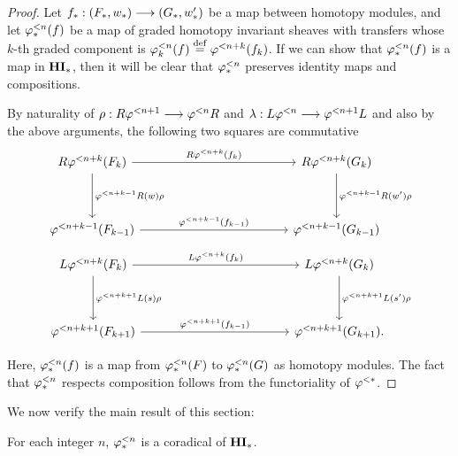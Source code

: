 \begin{proof}
Let $f_*: (F_*,\deloop_*) \to (G_*, \deloop_*')$ be a map between 
homotopy modules, and let $\tlHM{n}(f)$ be a map of graded 
homotopy invariant sheaves with transfers whose
$k$-th graded component is $\tlHM[k]{n}(f) \defeq \tlHI{n + k}(f_k)$. 
If we can show that $\tlHM{n}(f)$ is a map in $\HM$, then it will
be clear that $\tlHM{n}$ preserves identity maps and compositions.

By naturality of $\rho : R\tlHI{n + 1} \to \tlHI{n} R$ and 
$\lambda: L\tlHI{n} \to \tlHI{n + 1}L$ and also by the above 
arguments, the following two squares are commutative
\[
\begin{tikzcd}[column sep=12em, row sep=huge]
R\tlHI{n + k}(F_k) \arrow{r}{R \tlHI{n + k}(f_k)} 
   \arrow{d}{\tlHI{n + k - 1}R(\deloop) \rho} &
R\tlHI{n + k}(G_k) 
   \arrow{d}{\tlHI{n + k - 1}R(\deloop') \rho} \\
\tlHI{n + k - 1}(F_{k - 1}) 
   \arrow{r}{\tlHI{n + k - 1}(f_{k - 1})} &
\tlHI{n + k - 1}(G_{k - 1}) 
\end{tikzcd}
\]
\[
\begin{tikzcd}[column sep=12em, row sep=huge]
L\tlHI{n + k}(F_k) \arrow{r}{L \tlHI{n + k}(f_k)} 
   \arrow{d}{\tlHI{n + k + 1}L(\susp) \rho} &
L\tlHI{n + k}(G_k) 
   \arrow{d}{\tlHI{n + k + 1}L(\susp') \rho} \\
\tlHI{n + k + 1}(F_{k + 1}) 
   \arrow{r}{\tlHI{n + k + 1}(f_{k - 1})} &
\tlHI{n + k + 1}(G_{k + 1}).
\end{tikzcd}
\]

Here, $\tlHM{n}(f)$ is a map from $\tlHM{n}(F)$ to 
$\tlHM{n}(G)$ as homotopy modules. The fact that $\tlHM{n}$ 
respects composition follows from the functoriality of $\tlHI{*}$.
\end{proof}

We now verify the main result of this section:

\begin{thm}\label{thm_tlHM_corad}
For each integer $n$, $\tlHM{n}$ is a coradical of $\HM$.
\end{thm}

